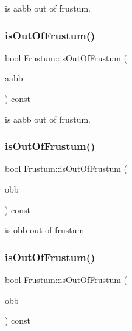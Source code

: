 is aabb out of frustum. \mbox{\label{classFrustum_a618fd2d27f0337512ca1b1aeee8580e1}} 
\subsubsection{\texorpdfstring{is\+Out\+Of\+Frustum()}{isOutOfFrustum()}\hspace{0.1cm}{\footnotesize\ttfamily [2/4]}}
{\footnotesize\ttfamily bool Frustum\+::is\+Out\+Of\+Frustum (\begin{DoxyParamCaption}\item[{const \hyperlink{classAABB}{A\+A\+BB} \&}]{aabb }\end{DoxyParamCaption}) const}

is aabb out of frustum. \mbox{\label{classFrustum_ae9285dfe28bfbf7d6439cddcec8d06cb}} 
\subsubsection{\texorpdfstring{is\+Out\+Of\+Frustum()}{isOutOfFrustum()}\hspace{0.1cm}{\footnotesize\ttfamily [3/4]}}
{\footnotesize\ttfamily bool Frustum\+::is\+Out\+Of\+Frustum (\begin{DoxyParamCaption}\item[{const \hyperlink{classOBB}{O\+BB} \&}]{obb }\end{DoxyParamCaption}) const}

is obb out of frustum \mbox{\label{classFrustum_ae9285dfe28bfbf7d6439cddcec8d06cb}} 
\subsubsection{\texorpdfstring{is\+Out\+Of\+Frustum()}{isOutOfFrustum()}\hspace{0.1cm}{\footnotesize\ttfamily [4/4]}}
{\footnotesize\ttfamily bool Frustum\+::is\+Out\+Of\+Frustum (\begin{DoxyParamCaption}\item[{const \hyperlink{classOBB}{O\+BB} \&}]{obb }\end{DoxyParamCaption}) const}

